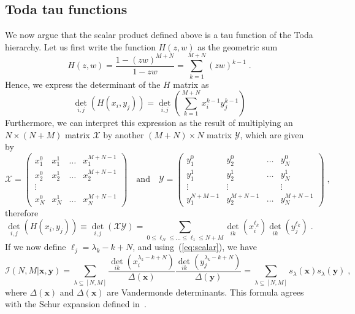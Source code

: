 \documentclass[a4paper,11pt]{amsart}
\begin{document}
\subsection{Toda tau functions}
We now argue that the scalar product defined above is a tau function
of the Toda hierarchy. Let us first write the function \(H(z,w)\) as
the geometric sum
\begin{equation}
\label{eq:h-exp}
  H(z,w) = \frac{1 - (zw)^{M+N}}{1 - zw} = \sum_{k=1}^{M+N} (zw)^{k-1} \; .
\end{equation}
Hence, we express the determinant of the \(H\) matrix as
\begin{equation}
  \det_{i,j} \left(H(x_i, y_j)\right) = \det_{i,j} \left( \sum_{k=1}^{M+N} x_i^{k-1} y_j^{k-1}\right)
\end{equation}
Furthermore, we can interpret this expression as the result of
multiplying an \(N\times (N+M)\) matrix \(\mathcal{X}\) by another
\((M + N)\times N\) matrix \(\mathcal{Y}\), which are given by
\begin{equation}
  \mathcal{X} = 
  \begin{pmatrix}
  x_1^0 & x_1^1 & \dots & x_1^{M+N-1} \\  
  x_2^0 & x_2^1 & \dots & x_2^{M+N-1} \\  
  \vdots \\
  x_N^0 & x_N^1 & \dots & x_N^{M+N-1} 
  \end{pmatrix}\quad \textrm{and} \quad 
  \mathcal{Y} = 
  \begin{pmatrix}
  y_1^0 & y_2^0 & \dots & y_N^0 \\  
  y_1^1 & y_2^1 & \dots & y_N^1 \\  
  \vdots & \vdots & & \vdots \\
  y_1^{N+M-1} & y_2^{M+N-1} & \dots & y_N^{M+N-1}
  \end{pmatrix}\; ,
\end{equation}
therefore 
\begin{equation}
  \det_{i,j} \left(H(x_i, y_j)\right)
  \equiv  \det_{i,j} \left( \mathcal{X}\mathcal{Y}\right)
  = \sum_{0 \leq \ell_{N} \leq \dots \leq \ell_1\leq N+M } \det_{ik}(x_i^{\ell_k}) \det_{ik}(y_j^{\ell_k})\; .
\end{equation}
If we now define \(\ell_j = \lambda_k - k + N\), and
using~(\ref{eq:scalar}), we have
\begin{equation}
\label{eq:scalar_exp}
\mathcal{I}(N, M|\bm{x}, \bm{y}) = \sum_{\lambda\subseteq [N,M]}
\frac{\det_{ik}(x_i^{\lambda_k - k + N})}{\Delta(\bm{x})} \frac{ \det_{ik}(y_j^{\lambda_k - k + N})}{\Delta(\bm{y})}
= \sum_{\lambda\subseteq [N,M]} s_\lambda(\bm{x}) s_\lambda(\bm{y}) \; ,
\end{equation}
where \(\Delta(\bm{x})\) and \(\Delta(\bm{x})\) are Vandermonde
determinants. This formula agrees with the Schur expansion defined
in~\cite{Bogoliubov2005}.
\end{document}
